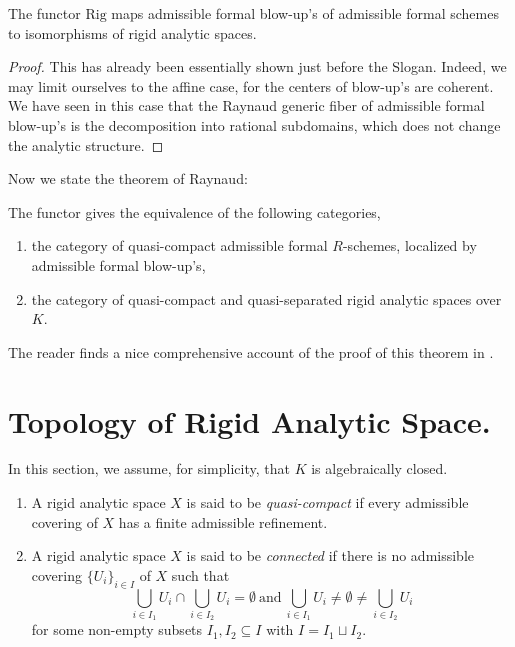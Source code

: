 \begin{apppro}\label{pro-blow-up}
The functor $\mathrm{Rig}$ maps admissible formal blow-up's of 
admissible formal schemes to isomorphisms of rigid analytic spaces.
\end{apppro}

\begin{proof}
This has already been essentially shown just before the Slogan.
Indeed, we may limit ourselves to the affine case, for the centers
of blow-up's are coherent.
We have seen in this case that the Raynaud generic fiber of 
admissible formal blow-up's is the decomposition into rational
subdomains, which does not change the analytic structure.
\end{proof}

\vspace{1ex}
Now we state the theorem of Raynaud:
\begin{appthm}[Raynaud\ 1972]
The functor gives the equivalence of the following categories,
\begin{enumerate}
\item the category of quasi-compact admissible formal $R$-schemes,
      localized by admissible formal blow-up's,
\item the category of quasi-compact and quasi-separated rigid analytic
      spaces over $K$.
\end{enumerate}
\end{appthm}

The reader finds a nice comprehensive account of the proof of this
theorem in \cite{farg1rs}.


\section{Topology of Rigid Analytic Space.}

In this section, we assume, for simplicity, that $K$ is algebraically
closed.

\begin{appdfn}
 \begin{enumerate}
  \renewcommand{\labelenumi}{(\arabic{enumi})}
  \item A rigid analytic space $X$ is said to be {\it quasi-compact} if
	every admissible covering of $X$ has a finite admissible 
	refinement.
  \item A rigid analytic space $X$ is said to be {\it connected} if there
	is no admissible covering $\{U_i\}_{i\in I}$ of $X$
	such that 
	\begin{equation*}
	 \bigcup_{i\in I_1}U_i\cap\bigcup_{i\in I_2}U_i=\emptyset\ 
	  \mathrm{and}\ 
	  \bigcup_{i\in I_1}U_i\neq\emptyset\neq\bigcup_{i\in I_2}U_i
	\end{equation*}	
	for some non-empty subsets $I_1,I_2\subseteq I$ with $I=I_1\sqcup I_2$.
 \end{enumerate}
\end{appdfn}

